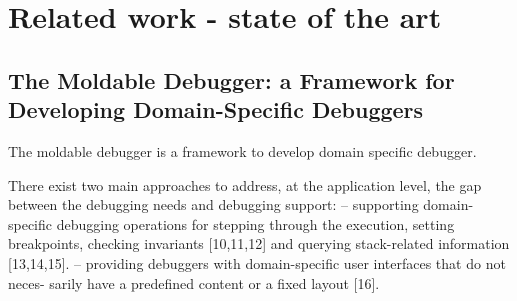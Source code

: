 

\chapter{Related work - state of the art}


\section{The Moldable Debugger: a Framework for Developing Domain-Specific Debuggers}

	The moldable debugger is a framework to develop domain specific debugger.


There exist two main approaches to address, at the application level, the gap between the debugging needs and debugging support:
– supporting domain-specific debugging operations for stepping through the execution, setting breakpoints, checking invariants [10,11,12] and querying stack-related information [13,14,15].
– providing debuggers with domain-specific user interfaces that do not neces- sarily have a predefined content or a fixed layout [16].


